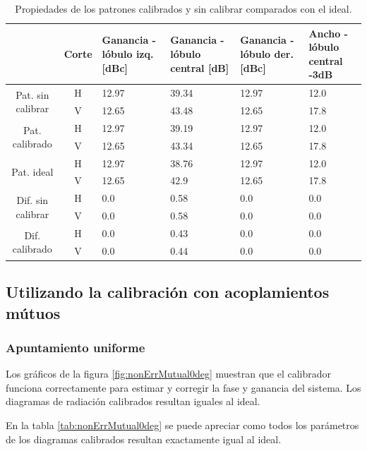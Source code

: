 \begin{table}[H]
  \footnotesize
  \centering
  \begin{tabular}{|c|c|p{2cm}|p{2.5cm}|p{2.5cm}|p{2.5cm}|}
    \cline{2-6}
    \multicolumn{1}{c|}{} & Corte & Ganancia - lóbulo izq. [dBc] & Ganancia - lóbulo central [dB] &
    Ganancia - lóbulo der. [dBc] & Ancho - lóbulo central -3dB \tabularnewline\hline
    \multirow{2}{2cm}{Pat. sin calibrar} & H & 12.97 & 39.34 & 12.97 & 12.0 \tabularnewline\cline{2-6}
     & V & 12.65 & 43.48 & 12.65 & 17.8 \tabularnewline\hline
    \multirow{2}{2cm}{Pat. calibrado} & H & 12.97 & 39.19 & 12.97 & 12.0 \tabularnewline\cline{2-6}
     & V & 12.65 & 43.34 & 12.65 & 17.8 \tabularnewline\hline
    \multirow{2}{2cm}{Pat. ideal} & H & 12.97 & 38.76 & 12.97 & 12.0 \tabularnewline\cline{2-6}
     & V & 12.65 & 42.9 & 12.65 & 17.8 \tabularnewline\hline
    \multirow{2}{2cm}{Dif. sin calibrar} & H & 0.0 & 0.58 & 0.0 & 0.0\tabularnewline\cline{2-6}
     & V & 0.0 & 0.58 & 0.0 & 0.0 \tabularnewline\hline
    \multirow{2}{2cm}{Dif. calibrado} & H & 0.0 & 0.43 & 0.0 & 0.0 \tabularnewline\cline{2-6}
     & V & 0.0 & 0.44 & 0.0 & 0.0 \tabularnewline\hline
  \end{tabular}
  \caption{Propiedades de los patrones calibrados y sin calibrar comparados con el ideal.}
  \label{tab:nonErrClassical10degRow}
\end{table}


\subsection{Utilizando la calibración con acoplamientos mútuos}


\subsubsection{Apuntamiento uniforme}

Los gráficos de la figura \ref{fig:nonErrMutual0deg} muestran que el calibrador funciona correctamente para estimar y corregir la 
fase y ganancia del sistema. Los diagramas de radiación calibrados resultan iguales al ideal.

En la tabla \ref{tab:nonErrMutual0deg} se puede apreciar como todos los parámetros de los diagramas calibrados resultan 
exactamente igual al ideal.

